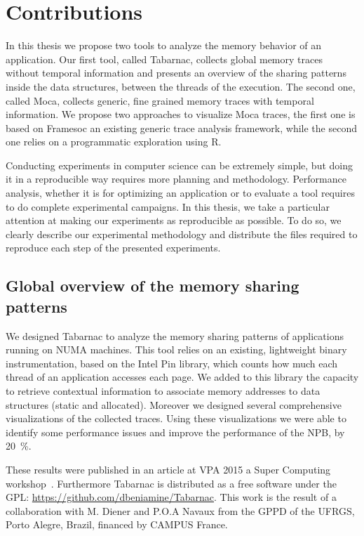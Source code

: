 \section{Contributions}

In this thesis we propose two tools to analyze the memory behavior of an application.
Our first tool, called \gls{Tabarnac}, collects global memory traces without temporal information and presents an overview of the sharing patterns inside the data structures, between the threads of the execution.
The second one, called \gls{Moca}, collects generic, fine grained  memory traces with temporal information.
We propose two approaches to visualize \gls{Moca} traces, the first one is based on \gls{Framesoc} an existing generic trace analysis framework, while the second one relies on a programmatic exploration using \gls{R}.

Conducting experiments in computer science can be extremely simple, but doing it in a reproducible way requires more planning and methodology.
Performance analysis, whether it is for optimizing an application or to evaluate a tool requires to do complete experimental campaigns.
In this thesis, we take a particular attention at making our experiments as reproducible as possible.
To do so, we clearly describe our experimental methodology and distribute the files required to reproduce each step of the presented experiments.

\subsection{Global overview of the memory sharing patterns}

We designed \gls{Tabarnac} to analyze the memory sharing patterns of applications running on \gls{NUMA} machines.
This tool relies on an existing, lightweight binary instrumentation, based on the \gls{Intel} \gls{Pin} library, which counts how much each thread of an application accesses each page.
We added to this library the capacity to retrieve contextual information to associate memory addresses to data structures (static and allocated).
Moreover we designed several comprehensive visualizations of the collected traces.
Using these visualizations we were able to identify some performance issues and improve the performance of the \gls{NPB}, \IS by \SI{20}{\%}.

These results were published in an article at \gls{VPA} 2015 a Super Computing workshop~\cite{Beniamine15TABARNAC}.
Furthermore \gls{Tabarnac} is distributed as a free software under the \gls{GPL}: \url{https://github.com/dbeniamine/Tabarnac}.
This work is the result of a collaboration with M. Diener and P.O.A Navaux from the \gls{GPPD} of the \gls{UFRGS}, Porto Alegre, Brazil, financed by CAMPUS France.

